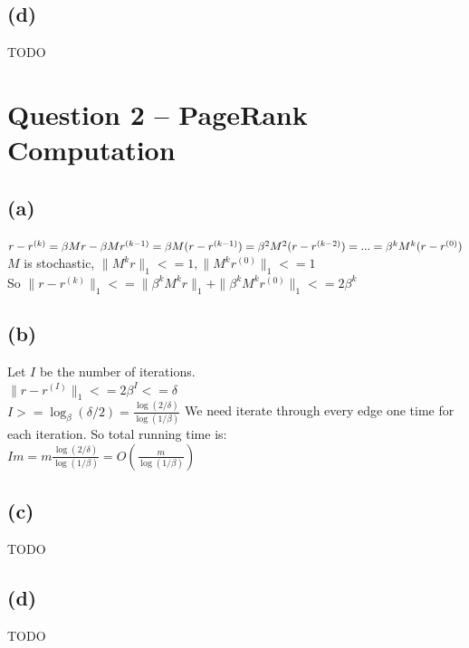 \documentclass{article}
\begin{document}
\subsection{(d)}
TODO

\section{Question 2 -- PageRank Computation}
\subsection{(a)}
$r - r^{(k)} = \beta Mr - \beta Mr^{(k-1)} \\
=\beta M(r - r^{(k-1)}) \\
=\beta^2M^2(r - r^{(k-2)}) \\
=... \\
=\beta^kM^k(r - r^{(0)})$ \\
$M$ is stochastic, $\|M^kr\|_1 <= 1, \|M^kr^{(0)}\|_1 <= 1$ \\
So $\|r - r^{(k)}\|_1 <= \|\beta^k M^kr\|_1 + \|\beta^k M^kr^{(0)}\|_1 <= 2\beta^k$

\subsection{(b)}
Let $I$ be the number of iterations. \\
$\|r - r^{(I)}\|_1<= 2\beta^I <= \delta$\\
$I >= \log_\beta (\delta/2) = \frac{\log (2/\delta)}{\log (1/\beta)}$
We need iterate through every edge one time for each iteration. So total running time is: \\
$Im = m \frac{\log (2/\delta)}{\log (1/\beta)} = O({\frac{m}{\log (1/\beta)}})$



\subsection{(c)}
TODO

\subsection{(d)}
TODO
\end{document}

